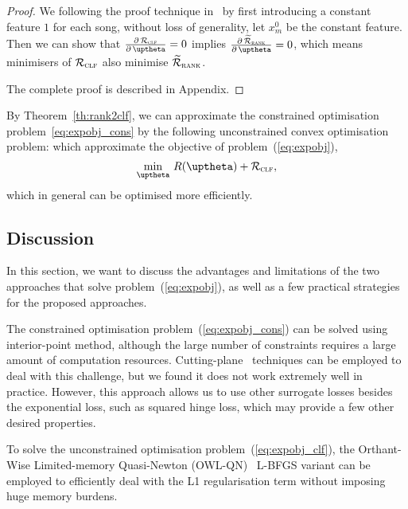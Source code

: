 \begin{proof}
We following the proof technique in~\cite{ertekin2011equivalence}
by first introducing a constant feature $1$ for each song,
without loss of generality, let $x_m^0$ be the constant feature.
Then we can show that
$\frac{\partial \, \RCal_\textsc{clf}} {\partial \, \uptheta} = 0$ implies
$\frac{\partial \, \widetilde\RCal_\textsc{rank}} {\partial \, \uptheta} = 0$,
which means minimisers of $\mathcal{R}_\textsc{clf}$ also minimise $\widetilde{\mathcal{R}}_\textsc{rank}$.

The complete proof is described in Appendix.
\end{proof}

By Theorem~\ref{th:rank2clf}, we can approximate the constrained optimisation problem~\ref{eq:expobj_cons}
by the following unconstrained convex optimisation problem:
which approximate the objective of problem~(\ref{eq:expobj}),
\begin{equation}
\label{eq:expobj_clf}
\min_{\uptheta} \, R(\uptheta) + \RCal_\textsc{clf},
\end{equation}
which in general can be optimised more efficiently.


\subsection{Discussion}

In this section, we want to discuss the advantages and limitations of the
two approaches that solve problem~(\ref{eq:expobj}),
as well as a few practical strategies for the proposed approaches.

The constrained optimisation problem~(\ref{eq:expobj_cons}) can be solved using interior-point method,
although the large number of constraints requires a large amount of computation resources.
Cutting-plane~\cite{avriel2003nonlinear} techniques can be employed to deal with this challenge,
but we found it does not work extremely well in practice.
However, this approach allows us to use other surrogate losses besides the exponential loss,
such as squared hinge loss, which may provide a few other desired properties. %

To solve the unconstrained optimisation problem~(\ref{eq:expobj_clf}),
the Orthant-Wise Limited-memory Quasi-Newton (OWL-QN)~\cite{andrew2007scalable} L-BFGS variant can be employed to
efficiently deal with the L1 regularisation term without imposing huge memory burdens.

